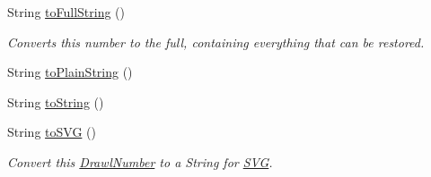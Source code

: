 \begin{DoxyCompactItemize}
String \hyperlink{interfacecom_1_1aarrelaakso_1_1drawl_1_1_number_accc9efbfff1dfc0ff3d6352e3c1cfd4e}{to\+Full\+String} ()
\begin{DoxyCompactList}\small\item\em Converts this number to the full, containing everything that can be restored. \end{DoxyCompactList}\item 
String \hyperlink{interfacecom_1_1aarrelaakso_1_1drawl_1_1_number_a0c6dd9fbd93fdb6d7e487f507d55ba43}{to\+Plain\+String} ()
\item 
String \hyperlink{interfacecom_1_1aarrelaakso_1_1drawl_1_1_number_a9dc0aea5633aebc8f5888b5a194dcd81}{to\+String} ()
\item 
String \hyperlink{interfacecom_1_1aarrelaakso_1_1drawl_1_1_number_a1cb9c85b621dc2669b2f52a4e82bdd3c}{to\+S\+VG} ()
\begin{DoxyCompactList}\small\item\em Convert this \hyperlink{classcom_1_1aarrelaakso_1_1drawl_1_1_drawl_number}{Drawl\+Number} to a String for \hyperlink{classcom_1_1aarrelaakso_1_1drawl_1_1_s_v_g}{S\+VG}. \end{DoxyCompactList}\end{DoxyCompactItemize}
